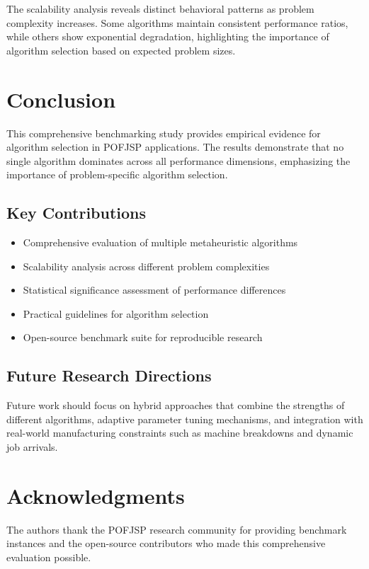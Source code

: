 \documentclass[11pt,twocolumn]{article}
\begin{document}
The scalability analysis reveals distinct behavioral patterns as problem complexity increases. Some algorithms maintain consistent performance ratios, while others show exponential degradation, highlighting the importance of algorithm selection based on expected problem sizes.


\section{Conclusion}

This comprehensive benchmarking study provides empirical evidence for algorithm selection in POFJSP applications. The results demonstrate that no single algorithm dominates across all performance dimensions, emphasizing the importance of problem-specific algorithm selection.

\subsection{Key Contributions}

\begin{itemize}
    \item Comprehensive evaluation of multiple metaheuristic algorithms
    \item Scalability analysis across different problem complexities
    \item Statistical significance assessment of performance differences
    \item Practical guidelines for algorithm selection
    \item Open-source benchmark suite for reproducible research
\end{itemize}

\subsection{Future Research Directions}

Future work should focus on hybrid approaches that combine the strengths of different algorithms, adaptive parameter tuning mechanisms, and integration with real-world manufacturing constraints such as machine breakdowns and dynamic job arrivals.

\section*{Acknowledgments}

The authors thank the POFJSP research community for providing benchmark instances and the open-source contributors who made this comprehensive evaluation possible.
\end{document}

